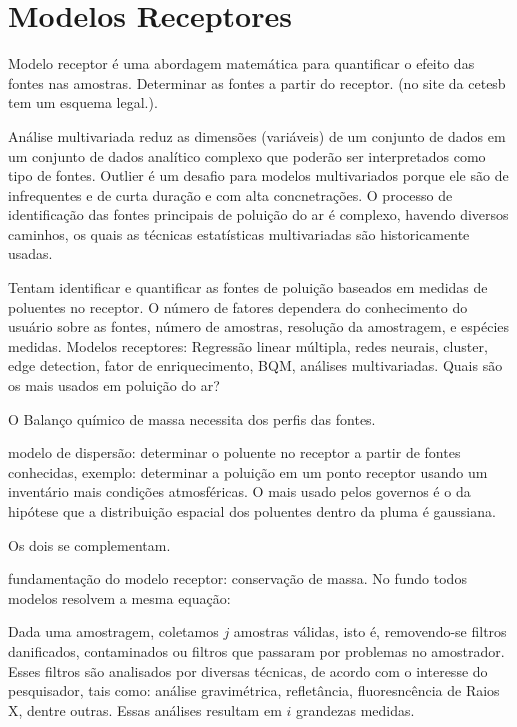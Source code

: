 \section{Modelos Receptores}

Modelo receptor é uma abordagem matemática para quantificar o efeito das fontes 
nas amostras. Determinar as fontes a partir do receptor. 
(no site da cetesb tem um esquema legal.).

Análise multivariada reduz as dimensões (variáveis) de um conjunto de dados 
em um conjunto de dados analítico complexo que poderão ser interpretados como 
tipo de fontes.
Outlier é um desafio para modelos multivariados porque ele são de infrequentes 
e de curta duração e com alta concnetrações.
O processo de identificação das fontes principais de poluição do ar é complexo,
havendo diversos caminhos, os quais as técnicas estatísticas multivariadas 
são historicamente usadas.

Tentam identificar e quantificar as fontes de poluição baseados em medidas de 
poluentes no receptor. 
O número de fatores dependera do conhecimento do usuário sobre as fontes, 
número de amostras, resolução da amostragem, e espécies medidas.
Modelos receptores: Regressão linear múltipla, redes neurais, cluster, 
edge detection, fator de enriquecimento, BQM, análises multivariadas. 
Quais são os mais usados em poluição do ar?

O Balanço químico de massa necessita dos perfis das fontes.

modelo de dispersão: determinar o poluente no receptor a partir de fontes 
conhecidas, exemplo: determinar a poluição em um ponto receptor usando um 
inventário mais condições atmosféricas. O mais usado pelos governos é o da 
hipótese que a distribuição espacial dos poluentes dentro da pluma é gaussiana.  

Os dois se complementam.

fundamentação do modelo receptor: conservação de massa. No fundo todos modelos resolvem a mesma equação: 

Dada uma amostragem, coletamos $j$ amostras válidas, isto é, removendo-se filtros danificados, contaminados ou filtros que passaram por problemas no amostrador. Esses filtros são analisados por diversas técnicas, de acordo com o interesse do pesquisador, tais como: análise gravimétrica, refletância, fluoresncência de Raios X, dentre outras. Essas análises resultam em $i$ grandezas medidas.

